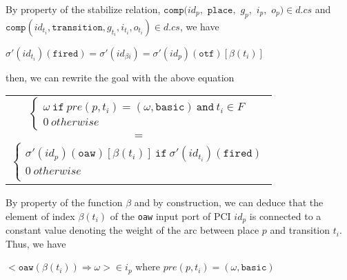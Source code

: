 \documentclass[dvipsnames,12pt]{article}
\begin{document}
\begin{niproof}
\begin{enumerate}
\begin{itemize}
\begin{itemize}
        By property of the stabilize relation, $\mathtt{comp}(id_p,$
        $\texttt{place},$ $g_p,$ $i_p,$ $o_p)\in{}d.cs$ and\\
        $\mathtt{comp}(id_{t_i},\texttt{transition},g_{t_i},i_{t_i},o_{t_i})\in{}d.cs$,
        we have
        \begin{center}
          $\sigma'(id_{t_i})(\texttt{fired})=\sigma'(id_{\beta{}i})=\sigma'(id_p)(\texttt{otf})[\beta(t_i)]$
        \end{center}
        then, we can rewrite the goal with the above equation
        \begin{frameb}
          \begin{tabular}{c}
            $\begin{cases}
              \omega~\mathtt{if}~pre(p,t_i)=(\omega,\mathtt{basic})~\mathtt{and}~t_i\in{}F\\
              0~otherwise
            \end{cases}$ \\
            $=$ \\
            $\begin{cases}
              \sigma'(id_p)(\texttt{oaw})[\beta(t_i)]~\mathtt{if}~\sigma'(id_{t_i})(\texttt{fired})\\
              0~otherwise\\
            \end{cases}$ \\
          \end{tabular}
        \end{frameb}

        By property of the function $\beta$ and by construction, we
        can deduce that the element of index $\beta(t_i)$ of the
        \texttt{oaw} input port of PCI $id_p$ is connected to a
        constant value denoting the weight of the arc between place
        $p$ and transition $t_i$. Thus, we have
        \begin{center}
          ${<}\texttt{oaw}(\beta(t_i))\mathtt{\Rightarrow{}}\omega{>}\in{}i_p$
          where $pre(p,t_i)=(\omega,\mathtt{basic})$
        \end{center}


\end{itemize}
\end{itemize}
\end{enumerate}
\end{niproof}
\end{document}
